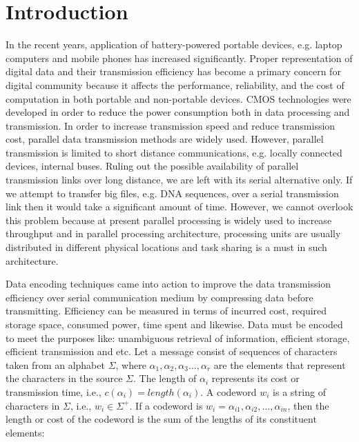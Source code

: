 \documentclass[preprint,12pt]{elsarticle}
\begin{document}

\section{Introduction}
\label{sec1}
In the recent years, application of battery-powered portable devices, e.g. laptop computers and mobile phones has increased significantly. Proper representation of digital data and their transmission efficiency has become a primary concern for digital community because it affects the performance, reliability, and the cost of computation in both portable and non-portable devices. CMOS technologies were developed in order to reduce the power consumption both in data processing and transmission. In order to increase transmission speed and reduce transmission cost, parallel data transmission methods are widely used. However, parallel transmission is limited to short distance communications, e.g. locally connected devices, internal buses. Ruling out the possible availability of parallel transmission links over long distance, we are left with its serial alternative only. If we attempt to transfer big files, e.g. DNA sequences, over a serial transmission link then it would take a significant amount of time. However, we cannot overlook this problem because at present parallel processing is widely used to increase throughput and in parallel processing architecture, processing units are usually distributed in different physical locations and task sharing is a must in such architecture.    

Data encoding techniques came into action to improve the data transmission efficiency over serial communication medium by compressing data before transmitting. Efficiency can be measured in terms of incurred cost, required storage space, consumed power, time spent and likewise. Data must be encoded to meet the purposes like: unambiguous retrieval of information, efficient storage, efficient transmission and etc. Let a message consist of sequences of characters taken from an alphabet $\Sigma$, where  $\alpha_1,\alpha_2,\alpha_3\ldots,\alpha_r$ are the elements that represent the characters in the source $\Sigma$. The length of $\alpha_i$ represents its cost or transmission time, i.e., $c\left(\alpha_i\right)= length(\alpha_i)$. A codeword $w_i$ is a string of characters in $\Sigma$, i.e., $w_i\in\Sigma^{+}$. If a codeword is $w_i=\alpha_{i1},\alpha_{i2},\ldots,\alpha_{in}$, then the length or cost of the codeword is the sum of the lengths of its constituent elements:
\end{document}
